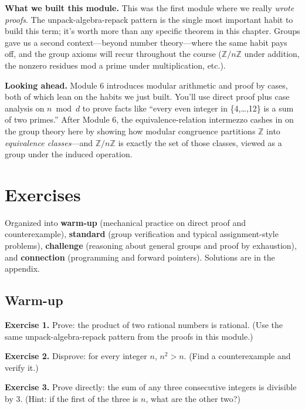 \documentclass[11pt]{article}
\begin{document}
\begin{summarybox}
\textbf{What we built this module.} This was the first module where we really \emph{wrote proofs}. The unpack-algebra-repack pattern is the single most important habit to build this term; it's worth more than any specific theorem in this chapter. Groups gave us a second context---beyond number theory---where the same habit pays off, and the group axioms will recur throughout the course ($\mathbb{Z}/n\mathbb{Z}$ under addition, the nonzero residues mod a prime under multiplication, etc.).

\medskip
\textbf{Looking ahead.} Module 6 introduces modular arithmetic and proof by cases, both of which lean on the habits we just built. You'll use direct proof plus case analysis on $n \bmod d$ to prove facts like ``every even integer in \{4,\ldots,12\} is a sum of two primes.'' After Module 6, the equivalence-relation intermezzo cashes in on the group theory here by showing how modular congruence partitions $\mathbb{Z}$ into \emph{equivalence classes}---and $\mathbb{Z}/n\mathbb{Z}$ is exactly the set of those classes, viewed as a group under the induced operation.
\end{summarybox}

\section{Exercises}

Organized into \textbf{warm-up} (mechanical practice on direct proof and counterexample), \textbf{standard} (group verification and typical assignment-style problems), \textbf{challenge} (reasoning about general groups and proof by exhaustion), and \textbf{connection} (programming and forward pointers). Solutions are in the appendix.

\subsection*{Warm-up}

\textbf{Exercise 1.}\label{ex:m5:1} Prove: the product of two rational numbers is rational. (Use the same unpack-algebra-repack pattern from the proofs in this module.)

\bigskip
\textbf{Exercise 2.}\label{ex:m5:2} Disprove: for every integer $n$, $n^2 > n$. (Find a counterexample and verify it.)

\bigskip
\textbf{Exercise 3.}\label{ex:m5:3} Prove directly: the sum of any three consecutive integers is divisible by $3$. (Hint: if the first of the three is $n$, what are the other two?)
\end{document}
